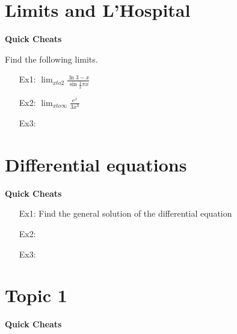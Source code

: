 \documentclass[12pt]{amsart}
\theoremstyle{plain}
\theoremstyle{definition}
\begin{document}
\section*{Limits and L'Hospital}               

\begin{mdframed}[style=MyFrame]
\begin{center}                 
\textbf{Quick Cheats}          
\end{center}                   

\end{mdframed}
Find the following limits. 
\begin{enumerate}
\setlength{\itemsep}{200pt} 
\item[Ex1:] $\lim_{x to 2} \frac{\ln 3-x}{\sin \frac{1}{2}\pi x}$                
\item[Ex2:] $\lim_{x to \infty} \frac{e^x}{3x^3}$                      
\item[Ex3:] 
\item[]
\end{enumerate}

\section*{Differential equations}             

\begin{mdframed}[style=MyFrame]
\begin{center}               
\textbf{Quick Cheats}          
\end{center}                   

\end{mdframed}

\begin{enumerate}
\setlength{\itemsep}{200pt}
\item[Ex1:] Find the general solution of the differential equation $$$$                
\item[Ex2:]                 
\item[Ex3:] 
\item[]
\end{enumerate}

\section*{Topic 1}             

\begin{mdframed}[style=MyFrame]
\begin{center}               
\textbf{Quick Cheats}          
\end{center}                   

\end{mdframed}
\end{document}
